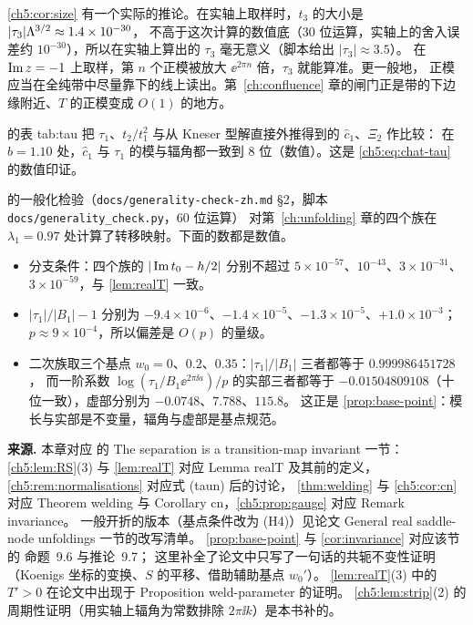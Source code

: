 \begin{remark}[在哪条线上取样]\label{ch5:rem:sampling}
\cref{ch5:cor:size} 有一个实际的推论。在实轴上取样时，$t_3$ 的大小是 $|\tau_3|\Lambda^{3/2}\approx1.4\times10^{-30}$，
不高于这次计算的数值底（30 位运算，实轴上的舍入误差约 $10^{-30}$），所以在实轴上算出的 $\tau_3$ 毫无意义（脚本给出 $|\tau_3|\approx3.5$）。
在 $\operatorname{Im} z=-1$ 上取样，第 $n$ 个正模被放大 $\ee^{2\pi n}$ 倍，$\tau_3$ 就能算准。更一般地，
正模应当在全纯带中尽量靠下的线上读出。第~\ref{ch:confluence} 章的闸门正是带的下边缘附近、$T$ 的正模变成 $O(1)$ 的地方。
\end{remark}

\cite{KneserPaper} 的表 tab:tau 把 $\tau_1$、$t_2/t_1^2$ 与从 Kneser 型解直接外推得到的 $\hat c_1$、$\Xi_2$ 作比较：
在 $b=1.10$ 处，$\hat c_1$ 与 $\tau_1$ 的模与辐角都一致到 8 位（数值）。这是 \eqref{ch5:eq:chat-tau} 的数值印证。

\begin{example}\label{ch5:exa:families}
\cite{KneserPaper} 的一般化检验（\texttt{docs/generality-check-zh.md} §2，脚本 \texttt{docs/generality\_check.py}，60 位运算）
对第~\ref{ch:unfolding} 章的四个族在 $\lambda_1=0.97$ 处计算了转移映射。下面的数都是数值。
\begin{itemize}
\item 分支条件：四个族的 $|\operatorname{Im} t_0-h/2|$ 分别不超过 $5\times10^{-57}$、$10^{-43}$、$3\times10^{-31}$、$3\times10^{-59}$，与 \cref{lem:realT} 一致。
\item $|\tau_1|/|B_1|-1$ 分别为 $-9.4\times10^{-6}$、$-1.4\times10^{-5}$、$-1.3\times10^{-5}$、$+1.0\times10^{-3}$；
  $p\approx9\times10^{-4}$，所以偏差是 $O(p)$ 的量级。
\item 二次族取三个基点 $w_0=0$、$0.2$、$0.35$：$|\tau_1|/|B_1|$ 三者都等于 $0.999986451728$，
  而一阶系数 $\log(\tau_1/B_1\ee^{2\pi\ii a})/p$ 的实部三者都等于 $-0.01504809108$（十位一致），虚部分别为 $-0.0748$、$7.788$、$115.8$。
  这正是 \cref{prop:base-point}：模长与实部是不变量，辐角与虚部是基点规范。
\end{itemize}
\end{example}

\notes

\textbf{来源.} 本章对应 \cite{KneserPaper} 的 The separation is a transition-map invariant 一节：
\cref{ch5:lem:RS}(3) 与 \cref{lem:realT} 对应 Lemma realT 及其前的定义，\cref{ch5:rem:normalisations} 对应式 (taun) 后的讨论，
\cref{thm:welding} 与 \cref{ch5:cor:cn} 对应 Theorem welding 与 Corollary cn，\cref{ch5:prop:gauge} 对应 Remark invariance。
一般开折的版本（基点条件改为 (H4)）见论文 General real saddle-node unfoldings 一节的改写清单。
\cref{prop:base-point} 与 \cref{cor:invariance} 对应该节的 命题~9.6 与推论~9.7；
这里补全了论文中只写了一句话的共轭不变性证明（Koenigs 坐标的变换、$S$ 的平移、借助辅助基点 $w_0'$）。
\cref{lem:realT}(3) 中的 $T'>0$ 在论文中出现于 Proposition weld-parameter 的证明。
\cref{ch5:lem:strip}(2) 的周期性证明（用实轴上辐角为常数排除 $2\pi\ii k$）是本书补的。

